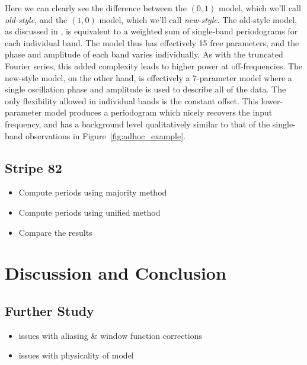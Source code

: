 \documentclass[12pt,preprint]{aastex}
\newcommand{\Fig}[1]{Figure~\ref{fig:#1}}
\newcommand{\fig}[1]{\Fig{#1}}
\newcommand{\sectlabel}[1]{\label{sect:#1}}
\begin{document}
Here we can clearly see the difference between the $(0,1)$ model, which we'll call {\it old-style}, and the $(1,0)$ model, which we'll call {\it new-style}. The old-style model, as discussed in \sectlabel{relationship}, is equivalent to a weighted sum of single-band periodograms for each individual band. The model thus has effectively 15 free parameters, and the phase and amplitude of each band varies individually. As with the truncated Fourier series, this added complexity leads to higher power at off-frequencies. The new-style model, on the other hand, is effectively a 7-parameter model where a single oscillation phase and amplitude is used to describe all of the data. The only flexibility allowed in individual bands is the constant offset. This lower-parameter model produces a periodogram which nicely recovers the input frequency, and has a background level qualitatively similar to that of the single-band observations in \fig{adhoc_example}.


\subsection{Stripe 82}

\begin{itemize}
  \item Compute periods using majority method
  \item Compute periods using unified method
  \item Compare the results
\end{itemize}

\section{Discussion and Conclusion}

\subsection{Further Study}
\begin{itemize}
  \item issues with aliasing \& window function corrections
  \item issues with physicality of model
\end{itemize}





\end{document}
